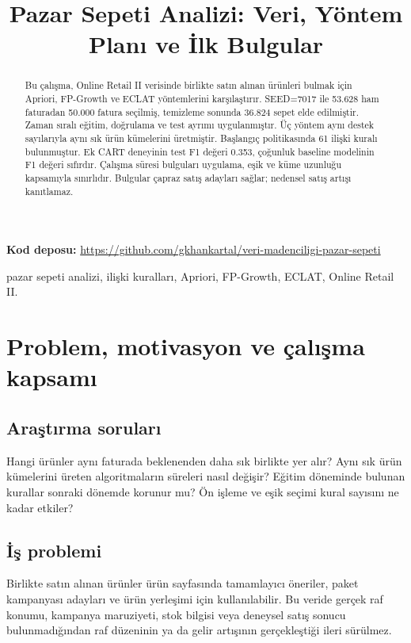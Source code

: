 \documentclass[conference,a4paper]{IEEEtran}
\begin{document}
\title{Pazar Sepeti Analizi: Veri, Yöntem Planı ve İlk Bulgular}
\author{}
\maketitle
{\small\raggedright\noindent\textbf{Kod deposu:} \url{https://github.com/gkhankartal/veri-madenciligi-pazar-sepeti}\par}
\begin{abstract}
Bu çalışma, Online Retail II verisinde birlikte satın alınan ürünleri bulmak için Apriori, FP-Growth ve ECLAT yöntemlerini karşılaştırır. SEED=7017 ile 53.628 ham faturadan 50.000 fatura seçilmiş, temizleme sonunda 36.824 sepet elde edilmiştir. Zaman sıralı eğitim, doğrulama ve test ayrımı uygulanmıştır. Üç yöntem aynı destek sayılarıyla aynı sık ürün kümelerini üretmiştir. Başlangıç politikasında 61 ilişki kuralı bulunmuştur. Ek CART deneyinin test F1 değeri 0.353, çoğunluk baseline modelinin F1 değeri sıfırdır. Çalışma süresi bulguları uygulama, eşik ve küme uzunluğu kapsamıyla sınırlıdır. Bulgular çapraz satış adayları sağlar; nedensel satış artışı kanıtlamaz.
\end{abstract}
\begin{IEEEkeywords}
pazar sepeti analizi, ilişki kuralları, Apriori, FP-Growth, ECLAT, Online Retail II.
\end{IEEEkeywords}
\section{Problem, motivasyon ve çalışma kapsamı}
\subsection{Araştırma soruları}
Hangi ürünler aynı faturada beklenenden daha sık birlikte yer alır? Aynı sık ürün kümelerini üreten algoritmaların süreleri nasıl değişir? Eğitim döneminde bulunan kurallar sonraki dönemde korunur mu? Ön işleme ve eşik seçimi kural sayısını ne kadar etkiler?

\subsection{İş problemi}
Birlikte satın alınan ürünler ürün sayfasında tamamlayıcı öneriler, paket kampanyası adayları ve ürün yerleşimi için kullanılabilir. Bu veride gerçek raf konumu, kampanya maruziyeti, stok bilgisi veya deneysel satış sonucu bulunmadığından raf düzeninin ya da gelir artışının gerçekleştiği ileri sürülmez.
\end{document}
